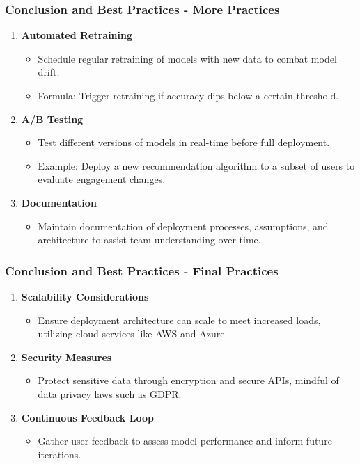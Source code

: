 \documentclass[aspectratio=169]{beamer}
\begin{document}
\begin{frame}[fragile]
    \frametitle{Conclusion and Best Practices - More Practices}
    \begin{enumerate}[resume]
        \item \textbf{Automated Retraining}
        \begin{itemize}
            \item Schedule regular retraining of models with new data to combat model drift.
            \item Formula: Trigger retraining if accuracy dips below a certain threshold.
        \end{itemize}

        \item \textbf{A/B Testing}
        \begin{itemize}
            \item Test different versions of models in real-time before full deployment.
            \item Example: Deploy a new recommendation algorithm to a subset of users to evaluate engagement changes.
        \end{itemize}

        \item \textbf{Documentation}
        \begin{itemize}
            \item Maintain documentation of deployment processes, assumptions, and architecture to assist team understanding over time.
        \end{itemize}
    \end{enumerate}
\end{frame}

\begin{frame}[fragile]
    \frametitle{Conclusion and Best Practices - Final Practices}
    \begin{enumerate}[resume]
        \item \textbf{Scalability Considerations}
        \begin{itemize}
            \item Ensure deployment architecture can scale to meet increased loads, utilizing cloud services like AWS and Azure.
        \end{itemize}
        
        \item \textbf{Security Measures}
        \begin{itemize}
            \item Protect sensitive data through encryption and secure APIs, mindful of data privacy laws such as GDPR.
        \end{itemize}
        
        \item \textbf{Continuous Feedback Loop}
        \begin{itemize}
            \item Gather user feedback to assess model performance and inform future iterations.
        \end{itemize}
    \end{enumerate}
\end{frame}
\end{document}
